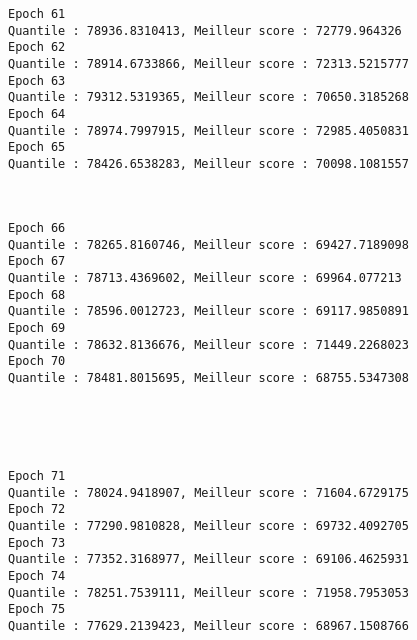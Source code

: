 \documentclass[11pt]{article}
\begin{document}
    \begin{Verbatim}[commandchars=\\\{\}]
Epoch 61
Quantile : 78936.8310413, Meilleur score : 72779.964326
Epoch 62
Quantile : 78914.6733866, Meilleur score : 72313.5215777
Epoch 63
Quantile : 79312.5319365, Meilleur score : 70650.3185268
Epoch 64
Quantile : 78974.7997915, Meilleur score : 72985.4050831
Epoch 65
Quantile : 78426.6538283, Meilleur score : 70098.1081557

    \end{Verbatim}

    \begin{center}
    \end{center}
    { \hspace*{\fill} \\}
    
    \begin{Verbatim}[commandchars=\\\{\}]
Epoch 66
Quantile : 78265.8160746, Meilleur score : 69427.7189098
Epoch 67
Quantile : 78713.4369602, Meilleur score : 69964.077213
Epoch 68
Quantile : 78596.0012723, Meilleur score : 69117.9850891
Epoch 69
Quantile : 78632.8136676, Meilleur score : 71449.2268023
Epoch 70
Quantile : 78481.8015695, Meilleur score : 68755.5347308

    \end{Verbatim}

    \begin{center}
    \end{center}
    { \hspace*{\fill} \\}
    
    \begin{center}
    \end{center}
    { \hspace*{\fill} \\}
    
    \begin{Verbatim}[commandchars=\\\{\}]
Epoch 71
Quantile : 78024.9418907, Meilleur score : 71604.6729175
Epoch 72
Quantile : 77290.9810828, Meilleur score : 69732.4092705
Epoch 73
Quantile : 77352.3168977, Meilleur score : 69106.4625931
Epoch 74
Quantile : 78251.7539111, Meilleur score : 71958.7953053
Epoch 75
Quantile : 77629.2139423, Meilleur score : 68967.1508766

    \end{Verbatim}
\end{document}
